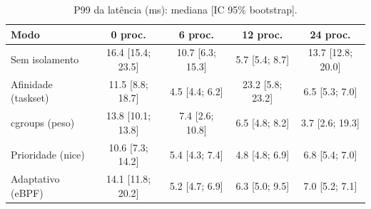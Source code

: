 \begin{table}[H]
\centering
\small
\caption{P99 da latência (ms): mediana [IC 95\% bootstrap].}
\label{tab:p99}
\begin{tabular}{lcccc}
\toprule
\textbf{Modo} & \textbf{0 proc.} & \textbf{6 proc.} & \textbf{12 proc.} & \textbf{24 proc.} \\
\midrule
Sem isolamento & 16.4 [15.4; 23.5] & 10.7 [6.3; 15.3] & 5.7 [5.4; 8.7] & 13.7 [12.8; 20.0] \\
Afinidade (taskset) & 11.5 [8.8; 18.7] & 4.5 [4.4; 6.2] & 23.2 [5.8; 23.2] & 6.5 [5.3; 7.0] \\
cgroups (peso) & 13.8 [10.1; 13.8] & 7.4 [2.6; 10.8] & 6.5 [4.8; 8.2] & 3.7 [2.6; 19.3] \\
Prioridade (nice) & 10.6 [7.3; 14.2] & 5.4 [4.3; 7.4] & 4.8 [4.8; 6.9] & 6.8 [5.4; 7.0] \\
Adaptativo (eBPF) & 14.1 [11.8; 20.2] & 5.2 [4.7; 6.9] & 6.3 [5.0; 9.5] & 7.0 [5.2; 7.1] \\
\bottomrule
\end{tabular}
\end{table}
